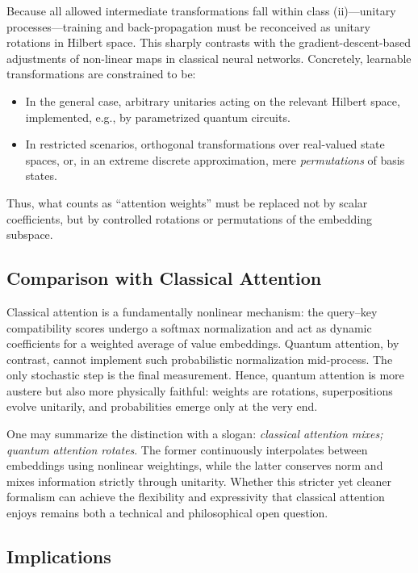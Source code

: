 \documentclass[%
  reprint,
  superscriptaddress,
  showpacs,
  showkeys,
  amsmath,amssymb,
  pra,
  longbibliography,
  floatfix,
  x11names
]{revtex4-2}
\begin{document}
Because all allowed intermediate transformations fall within class (ii)---unitary
processes---training and back-propagation must be reconceived as
unitary rotations in Hilbert space. This sharply contrasts with the gradient-descent-based
adjustments of non-linear maps in classical neural networks.
Concretely, learnable transformations are constrained to be:
\begin{itemize}
    \item In the general case, arbitrary unitaries acting on the relevant Hilbert space,
    implemented, e.g., by parametrized quantum circuits.
    \item In restricted scenarios, orthogonal transformations over real-valued state spaces,
    or, in an extreme discrete approximation, mere \emph{permutations} of basis states.
\end{itemize}
Thus, what counts as ``attention weights'' must be replaced not by scalar coefficients,
but by controlled rotations or permutations of the embedding subspace.

\subsection{Comparison with Classical Attention}

Classical attention is a fundamentally nonlinear mechanism:
the query--key compatibility scores undergo a softmax normalization
and act as dynamic coefficients for a weighted average of value embeddings.
Quantum attention, by contrast, cannot implement such probabilistic normalization
mid-process. The only stochastic step is the final measurement.
Hence, quantum attention is more austere but also more physically faithful:
weights are rotations, superpositions evolve unitarily,
and probabilities emerge only at the very end.

One may summarize the distinction with a slogan:
\emph{classical attention mixes; quantum attention rotates}.
The former continuously interpolates between embeddings using nonlinear weightings,
while the latter conserves norm and mixes information strictly through unitarity.
Whether this stricter yet cleaner formalism can achieve the flexibility and
expressivity that classical attention enjoys remains both a technical and
philosophical open question.

\subsection{Implications}
\end{document}
